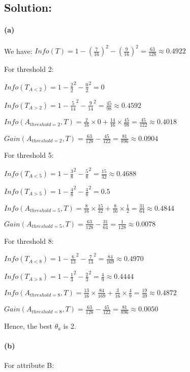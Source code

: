 \subsection*{Solution:}

\paragraph*{(a)} We have: $Info(T) = 1 - (\frac{7}{16})^2 - (\frac{9}{16})^2 = \frac{63}{128} \approx 0.4922$

For threshold 2:

$Info(T_{A<2}) = 1 - \frac{2}{2}^2 - \frac{0}{2}^2 = 0$

$Info(T_{A>2}) = 1 - \frac{5}{14}^2- \frac{9}{14}^2 = \frac{45}{98} \approx 0.4592$

$Info(A_{threshold=2}, T) = \frac{2}{16} \times 0 + \frac{14}{16} \times \frac{45}{98} = \frac{45}{122} \approx 0.4018$

$Gain(A_{threshold=2}, T) = \frac{63}{128} - \frac{45}{122} = \frac{81}{896} \approx 0.0904$

For threshold 5:

$Info(T_{A<5}) = 1 - \frac{3}{8}^2 - \frac{5}{8}^2 = \frac{15}{32} \approx 0.4688$

$Info(T_{A>5}) = 1 - \frac{4}{8}^2- \frac{4}{8}^2 = 0.5$

$Info(A_{threshold=5}, T) = \frac{8}{16} \times \frac{15}{32} + \frac{8}{16} \times \frac{1}{2} = \frac{31}{64} \approx 0.4844$

$Gain(A_{threshold=5}, T) = \frac{63}{128} - \frac{31}{64} = \frac{1}{128} \approx 0.0078$

For threshold 8:

$Info(T_{A<8}) = 1 - \frac{6}{13}^2 - \frac{7}{13}^2 = \frac{84}{169} \approx 0.4970$

$Info(T_{A>8}) = 1 - \frac{1}{3}^2- \frac{2}{3}^2 = \frac{4}{9} \approx 0.4444$

$Info(A_{threshold=8}, T) = \frac{13}{16} \times \frac{84}{169} + \frac{3}{16} \times \frac{4}{9} = \frac{19}{39} \approx 0.4872$

$Gain(A_{threshold=8}, T) = \frac{63}{128} - \frac{45}{122} = \frac{81}{896} \approx 0.0050$

Hence, the best $\theta_a$ is 2.

\paragraph*{(b)}

For attribute B:

